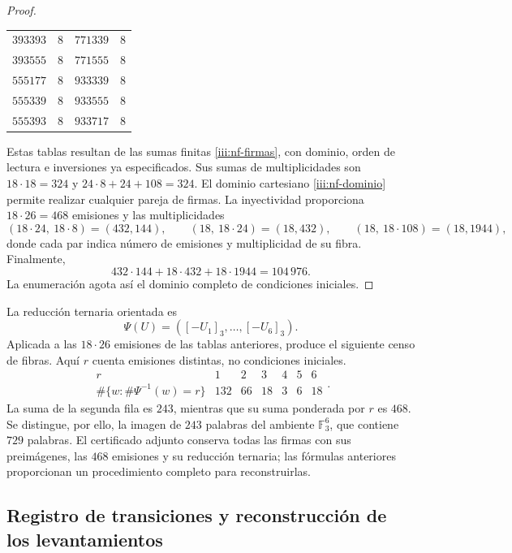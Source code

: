\begin{proof}
\begin{center}
\begin{tabular}{rr@{\qquad}rr}
$393393$&$8$&$771339$&$8$\\
$393555$&$8$&$771555$&$8$\\
$555177$&$8$&$933339$&$8$\\
$555339$&$8$&$933555$&$8$\\
$555393$&$8$&$933717$&$8$
\end{tabular}
\end{center}
Estas tablas resultan de las sumas finitas \eqref{iii:nf-firmas}, con
dominio, orden de lectura e inversiones ya especificados. Sus sumas
de multiplicidades son $18\cdot18=324$ y
$24\cdot8+24+108=324$. El dominio cartesiano
\eqref{iii:nf-dominio} permite realizar cualquier pareja de firmas.
La inyectividad proporciona $18\cdot26=468$ emisiones y las
multiplicidades
\[
 (18\cdot24,\ 18\cdot8)=(432,144),\qquad
 (18,\ 18\cdot24)=(18,432),\qquad
 (18,\ 18\cdot108)=(18,1944),
\]
donde cada par indica número de emisiones y multiplicidad de su fibra.
Finalmente,
\[
 432\cdot144+18\cdot432+18\cdot1944=104\,976.
\]
La enumeración agota así el dominio completo de condiciones iniciales.
\end{proof}

La reducción ternaria orientada es
\[
 \Psi(U)=([-U_1]_3,\ldots,[-U_6]_3).
\]
Aplicada a las $18\cdot26$ emisiones de las tablas anteriores,
produce el siguiente censo de fibras. Aquí $r$ cuenta emisiones
distintas, no condiciones iniciales.
\begin{equation}
 \begin{array}{c|rrrrrr}
 r&1&2&3&4&5&6\\ \hline
 \#\{w:\#\Psi^{-1}(w)=r\}&132&66&18&3&6&18
 \end{array}.
 \label{iii:nf-censo-ternario}
\end{equation}
La suma de la segunda fila es $243$, mientras que su suma ponderada
por $r$ es $468$. Se distingue, por ello, la imagen de $243$ palabras
del ambiente $\mathbb F_3^6$, que contiene $729$ palabras. El certificado
adjunto conserva todas las firmas con sus preimágenes, las $468$
emisiones y su reducción ternaria; las fórmulas anteriores proporcionan
un procedimiento completo para reconstruirlas.

\subsection{Registro de transiciones y reconstrucción de los levantamientos}

